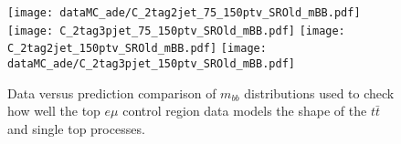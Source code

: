 \begin{figure}[hpbt!]
	\centering
  \texttt{[image: dataMC\_ade/C\_2tag2jet\_75\_150ptv\_SROld\_mBB.pdf]}
  \texttt{[image: C\_2tag3pjet\_75\_150ptv\_SROld\_mBB.pdf]}
  \texttt{[image: C\_2tag2jet\_150ptv\_SROld\_mBB.pdf]}
  \texttt{[image: dataMC\_ade/C\_2tag3pjet\_150ptv\_SROld\_mBB.pdf]}
	\caption{Data versus prediction comparison of $m_{bb}$ distributions used to
    check how well the top $e\mu$ control region data models the shape of the
    $t\bar{t}$ and single top processes.}
	\label{fig:ttbardd-mbb}
\end{figure}
